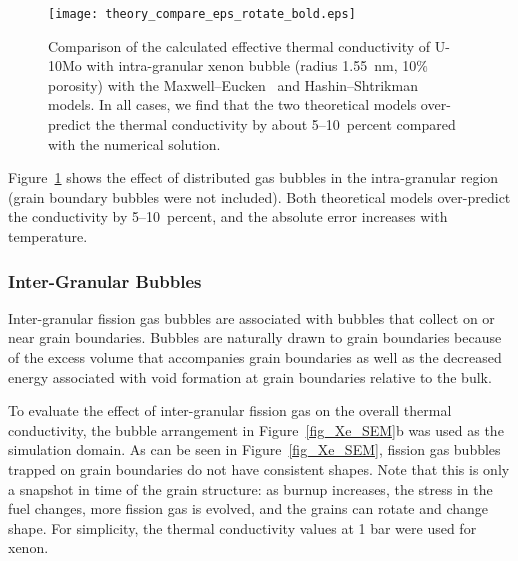 \begin{figure}%
	\centering
	\texttt{[image: theory\_compare\_eps\_rotate\_bold.eps]}
	\caption[Comparison of the calculated effective thermal conductivity of U-10Mo with intra-granular xenon bubble (radius 1.55~nm, 10$\%$ porosity) with the Maxwell--Eucken~\cite{maxwell1881treatise} and Hashin--Shtrikman~\cite{hashin1962variational} models.]{Comparison of the calculated effective thermal conductivity of U-10Mo with intra-granular xenon bubble (radius 1.55~nm, 10$\%$ porosity) with the Maxwell--Eucken~\cite{maxwell1881treatise} and Hashin--Shtrikman~\cite{hashin1962variational} models. In all cases, we find that the
      two theoretical models over-predict the thermal conductivity by about
      5--10~percent compared with the numerical solution.}
	\label{fig_compare}
\end{figure}

Figure~\ref{fig_compare} shows the effect of distributed gas bubbles in the intra-granular region (grain boundary bubbles were not included). Both theoretical models over-predict the conductivity by 5--10~percent, and the absolute error increases with temperature.

\subsubsection{Inter-Granular Bubbles}
Inter-granular fission gas bubbles are associated with bubbles that collect on
or near grain boundaries. Bubbles are naturally drawn to grain boundaries
because of the excess volume that accompanies grain boundaries as well as
the decreased energy associated with void formation at grain boundaries
relative to the bulk.

To evaluate the effect of inter-granular fission gas on the overall thermal conductivity, the bubble arrangement in Figure~\ref{fig_Xe_SEM}b was used as the simulation domain. As can be seen in Figure~\ref{fig_Xe_SEM}, fission gas bubbles trapped on grain boundaries do not have consistent shapes. Note that this is only a snapshot in time of the grain structure: as burnup increases, the stress in the fuel changes, more fission gas is evolved, and the grains can rotate and change shape. For simplicity, the thermal conductivity values at 1 bar were used for xenon. 

